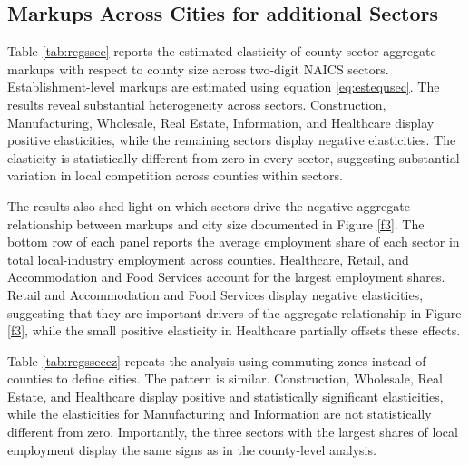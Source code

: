 \subsection{Markups Across Cities for additional Sectors}\label{a:addregs}
Table \ref{tab:regssec} reports the estimated elasticity of county-sector aggregate markups with respect to county size across two-digit NAICS sectors. Establishment-level markups are estimated using equation \eqref{eq:estequsec}. The results reveal substantial heterogeneity across sectors. Construction, Manufacturing, Wholesale, Real Estate, Information, and Healthcare display positive elasticities, while the remaining sectors display negative elasticities. The elasticity is statistically different from zero in every sector, suggesting substantial variation in local competition across counties within sectors.

The results also shed light on which sectors drive the negative aggregate relationship between markups and city size documented in Figure \ref{f3}. The bottom row of each panel reports the average employment share of each sector in total local-industry employment across counties. Healthcare, Retail, and Accommodation and Food Services account for the largest employment shares. Retail and Accommodation and Food Services display negative elasticities, suggesting that they are important drivers of the aggregate relationship in Figure \ref{f3}, while the small positive elasticity in Healthcare partially offsets these effects.

Table \ref{tab:regsseccz} repeats the analysis using commuting zones instead of counties to define cities. The pattern is similar. Construction, Wholesale, Real Estate, and Healthcare display positive and statistically significant elasticities, while the elasticities for Manufacturing and Information are not statistically different from zero. Importantly, the three sectors with the largest shares of local employment display the same signs as in the county-level analysis.

\newpage

